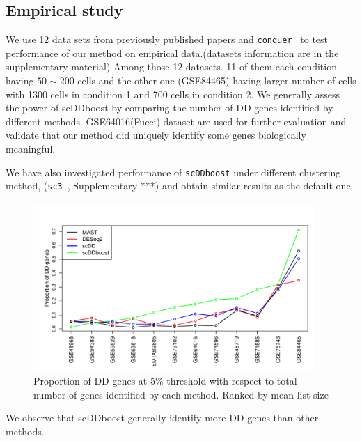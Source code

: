 \documentclass[aoas,preprint]{imsart}
\begin{document}
\subsection{Empirical study}


We use 12 data sets from previously published papers and \verb+conquer+~\citep{ref:Cq} to test 
performance of our method on empirical data.(datasets information are in the supplementary material) 
Among those 12 datasets. 11 of them each condition having $50 \sim 200$ cells and the other one (GSE84465) having larger number of cells with 1300 cells in condition 1 and 700 cells in condition 2.
We generally assess the power of scDDboost by comparing the number of DD genes identified by different methods. 
GSE64016(Fucci) dataset are used for further evaluation and validate that our method did uniquely identify some genes biologically meaningful.

We have also investigated performance of \verb+scDDboost+ under different clustering 
method, (\verb+sc3+~\citep{sc3}, Supplementary ***)  and obtain similar results as the default one.

\begin{figure}[H]
\includegraphics[width = 0.95\textwidth]{Figs/DD95.pdf}
 \caption{ Proportion of DD genes at 5\% threshold with respect to total number of genes identified by each method. Ranked by mean list size }
  \label{fig:6}
\end{figure}

We observe that scDDboost generally identify more DD genes than other methods.
\end{document}
